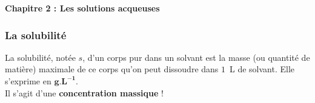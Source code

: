 \renewcommand{\thesubsection}{\textcolor{red}{\Roman{section}.\arabic{subsection}}}
\renewcommand{\thesubsubsection}{\textcolor{red}{\Roman{section}.\arabic{subsection}.\alph{subsubsection}}}

\setcounter{section}{0}
\sndEnTeteCoursDeux

\begin{mdframed}[style=titr, leftmargin=60pt, rightmargin=60pt, innertopmargin=7pt, innerbottommargin=7pt, innerrightmargin=8pt, innerleftmargin=8pt]

\begin{center}
\large{\textbf{Chapitre 2 : Les solutions acqueuses}}
\end{center}
\end{mdframed}

\subsubsection{La solubilité}
\begin{tcolorbox}[colback=green!5!white,colframe=green!75!black,title=\textbf{Définition de la solubilité}]
La solubilité, notée $s$, d'un corps pur dans un solvant est la masse (ou quantité de matière) maximale de ce corps qu'on peut dissoudre dans $1$~L de solvant. Elle s'exprime en $\mathbf{g.L^{-1}}$.\\
Il s'agit d'une \textbf{concentration massique} !
\end{tcolorbox}

